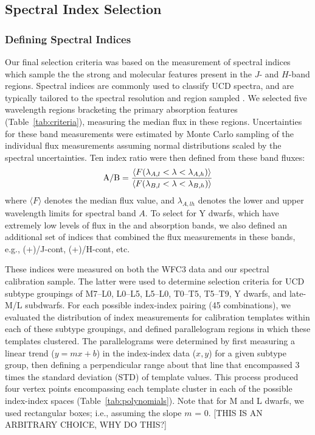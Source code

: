 \documentclass[manuscript]{aastex63}
\begin{document}
\subsection{Spectral Index Selection}

\subsubsection{Defining Spectral Indices}


Our final selection criteria was based on the measurement of spectral indices which sample the the strong \meth and \wat molecular features present in the $J$- and $H$-band regions. Spectral indices are commonly used to classify UCD spectra, and are typically tailored to the spectral resolution and region sampled \citep{1999AJ....117.1010T,2000AJ....119.3019C,2007ApJ...657..511A,2007ApJ...658..557B}. 
We selected five wavelength regions bracketing the primary absorption features (Table~\ref{tab:criteria}), measuring the median flux in these regions. Uncertainties for these band measurements were estimated by Monte Carlo sampling of the individual flux measurements assuming normal distributions  scaled by the spectral uncertainties. Ten index ratio were then defined from these band fluxes: 
 \begin{equation} 
 {\rm A/B} =\frac{ \langle  F(\lambda_{A,l}<\lambda < \lambda_{A,h}) \rangle }{  \langle F(\lambda_{B,l} < \lambda <\lambda_{B,h}) \rangle }
 \end{equation}
where $\langle{F}\rangle$ denotes the median flux value, and $\lambda_{A,lh}$ denotes the lower and upper wavelength limits for spectral band $A$. To select for Y dwarfs, which have extremely low levels of flux in the \wat and \meth absorption bands, we also defined an additional set of indices that combined the flux measurements in these bands, e.g., (+\meth)/J-cont, (+\meth)/H-cont, etc. 

These indices were measured on both the WFC3 data and our spectral calibration sample. The latter were used to determine selection criteria for UCD subtype groupings of M7--L0, L0--L5, L5--L0, T0--T5, T5--T9, Y dwarfs, and late-M/L subdwarfs. 
For each possible index-index pairing (45 combinations), we evaluated the
distribution of index measurements for calibration templates within each of these subtype groupings, and defined  parallelogram regions in which these templates clustered. The parallelograms were determined by first measuring a linear trend ($y = mx+b$) in the index-index data ($x,y$) for a given subtype group, then defining a perpendicular range about that line that encompassed 3 times the standard deviation (STD) of template values. This process produced four vertex points encompassing each template cluster in each of the possible index-index spaces (Table~\ref{tab:polynomials}). Note that for M and L dwarfs, we used rectangular boxes; i.e., assuming the slope $m$ = 0. [THIS IS AN ARBITRARY CHOICE, WHY DO THIS?]
\end{document}
